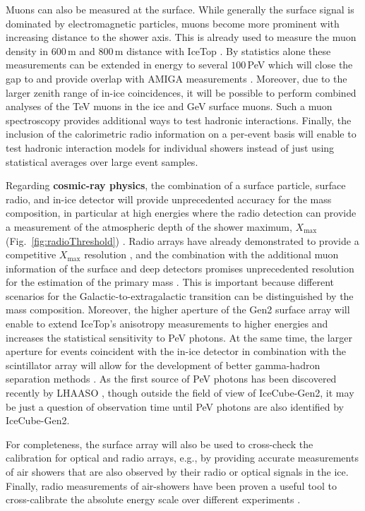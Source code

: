 \documentclass[a4paper,11pt]{article}
\begin{document}
Muons can also be measured at the surface. While generally the surface signal is dominated by electromagnetic particles, muons become more prominent with increasing distance to the shower axis. 
This is already used to measure the muon density in $600\,$m and $800\,$m distance with IceTop \cite{Gonzalez:2019epd}. 
By statistics alone these measurements can be extended in energy to several $100\,$PeV which will close the gap to and provide overlap with AMIGA measurements \cite{Aab:2020frk}.
Moreover, due to the larger zenith range of in-ice coincidences, it will be possible to perform combined analyses of the TeV muons in the ice and GeV surface muons.
Such a muon spectroscopy provides additional ways to test hadronic interactions. 
Finally, the inclusion of the calorimetric radio information on a per-event basis will enable to test hadronic interaction models for individual showers instead of just using statistical averages over large event samples.

Regarding \textbf{cosmic-ray physics}, the combination of a surface particle, surface radio, and in-ice detector will provide unprecedented accuracy for the mass composition, in particular at high energies where the radio detection can provide a measurement of the atmospheric depth of the shower maximum, $X_\mathrm{max}$ (Fig.~\ref{fig:radioThreshold}) \cite{HuegeReview2016, SchroederReview2016}.
Radio arrays have already demonstrated to provide a competitive  $X_\mathrm{max}$ resolution \cite{TunkaRexPRD2018, LOFARNature2016}, and the combination with the additional muon information of the surface and deep detectors promises unprecedented resolution for the estimation of the primary mass \cite{Holt:2019fnj}.
This is important because different scenarios for the Galactic-to-extragalactic transition can be distinguished by the mass composition. 
Moreover, the higher aperture of the Gen2 surface array will enable to extend IceTop's anisotropy measurements to higher energies and increases the statistical sensitivity to PeV photons. 
At the same time, the larger aperture for events coincident with the in-ice detector in combination with the scintillator array will allow for the development of better gamma-hadron separation methods \cite{Aartsen:2019sid}. 
As the first source of PeV photons has been discovered recently by LHAASO \cite{LHAASO_Nature2021}, though outside the field of view of IceCube-Gen2, it may be just a question of observation time until PeV photons are also identified by IceCube-Gen2.

For completeness, the surface array will also be used to cross-check the calibration for optical and radio arrays, e.g., by providing accurate measurements of air showers that are also observed by their radio or optical signals in the ice. 
Finally, radio measurements of air-showers have been proven a useful tool to cross-calibrate the absolute energy scale over different experiments \cite{Apel:2016gws}.
\end{document}
